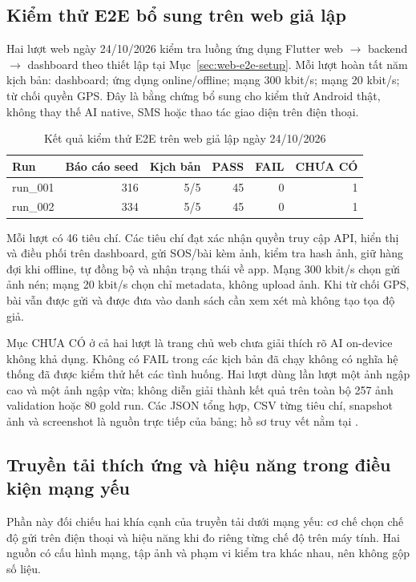 \subsection{Kiểm thử E2E bổ sung trên web giả lập}\label{sec:web-e2e-results}
Hai lượt web ngày 24/10/2026 kiểm tra luồng ứng dụng Flutter web $\rightarrow$ backend $\rightarrow$ dashboard theo thiết lập tại Mục~\ref{sec:web-e2e-setup}. Mỗi lượt hoàn tất năm kịch bản: dashboard; ứng dụng online/offline; mạng 300 kbit/s; mạng 20 kbit/s; từ chối quyền GPS. Đây là bằng chứng bổ sung cho kiểm thử Android thật, không thay thế AI native, SMS hoặc thao tác giao diện trên điện thoại.

\begin{table}[htbp]\centering\small
\caption{Kết quả kiểm thử E2E trên web giả lập ngày 24/10/2026}\label{tab:web-e2e-results}
\begin{tabular}{lrrrrr}
\toprule Run & Báo cáo seed & Kịch bản & PASS & FAIL & CHƯA CÓ \\
\midrule
run\_001 & 316 & 5/5 & 45 & 0 & 1 \\
run\_002 & 334 & 5/5 & 45 & 0 & 1 \\
\bottomrule
\end{tabular}
\end{table}

Mỗi lượt có 46 tiêu chí. Các tiêu chí đạt xác nhận quyền truy cập API, hiển thị và điều phối trên dashboard, gửi SOS/bài kèm ảnh, kiểm tra hash ảnh, giữ hàng đợi khi offline, tự đồng bộ và nhận trạng thái về app. Mạng 300 kbit/s chọn gửi ảnh nén; mạng 20 kbit/s chọn chỉ metadata, không upload ảnh. Khi từ chối GPS, bài vẫn được gửi và được đưa vào danh sách cần xem xét mà không tạo tọa độ giả.

Mục CHƯA CÓ ở cả hai lượt là trang chủ web chưa giải thích rõ AI on-device không khả dụng. Không có FAIL trong các kịch bản đã chạy không có nghĩa hệ thống đã được kiểm thử hết các tình huống. Hai lượt dùng lần lượt một ảnh ngập cao và một ảnh ngập vừa; không diễn giải thành kết quả trên toàn bộ 257 ảnh validation hoặc 80 gold run. Các JSON tổng hợp, CSV từng tiêu chí, snapshot ảnh và screenshot là nguồn trực tiếp của bảng; hồ sơ truy vết nằm tại .

\subsection{Truyền tải thích ứng và hiệu năng trong điều kiện mạng yếu}\label{sec:weak-network-results}
Phần này đối chiếu hai khía cạnh của truyền tải dưới mạng yếu: cơ chế chọn chế độ gửi trên điện thoại và hiệu năng khi đo riêng từng chế độ trên máy tính. Hai nguồn có cấu hình mạng, tập ảnh và phạm vi kiểm tra khác nhau, nên không gộp số liệu.

